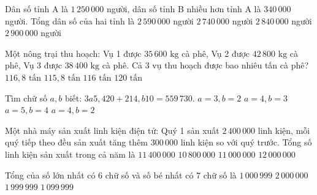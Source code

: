 \begin{ex} %
Dân số tỉnh A là $1\,250\,000$ người, dân số tỉnh B nhiều hơn tỉnh A là $340\,000$ người. Tổng dân số của hai tỉnh là
\choice
{$2\,590\,000$ người}
{$2\,740\,000$ người}
{\True $2\,840\,000$ người}
{$2\,900\,000$ người}
\end{ex}

\begin{ex} %
Một nông trại thu hoạch: Vụ 1 được $35\,600\text{ kg}$ cà phê, Vụ 2 được $42\,800\text{ kg}$ cà phê, Vụ 3 được $38\,400\text{ kg}$ cà phê. Cả 3 vụ thu hoạch được bao nhiêu tấn cà phê?
\choice
{\True $116{,}8\text{ tấn}$}
{$115{,}8\text{ tấn}$}
{$116\text{ tấn}$}
{$120\text{ tấn}$}
\end{ex}

\begin{ex} %
Tìm chữ số $a, b$ biết: $3a5,420 + 214,b10 = 559\,730$.
\choice
{$a = 3, b = 2$}
{\True $a = 4, b = 3$}
{$a = 5, b = 4$}
{$a = 4, b = 2$}
\end{ex}

\begin{ex} %
Một nhà máy sản xuất linh kiện điện tử: Quý 1 sản xuất $2\,400\,000$ linh kiện, mỗi quý tiếp theo đều sản xuất tăng thêm $300\,000$ linh kiện so với quý trước. Tổng số linh kiện sản xuất trong cả năm là
\choice
{\True $11\,400\,000$}
{$10\,800\,000$}
{$11\,000\,000$}
{$12\,000\,000$}
\end{ex}

\begin{ex} %
Tổng của số lớn nhất có 6 chữ số và số bé nhất có 7 chữ số là
\choice
{$1\,000\,999$}
{$2\,000\,000$}
{\True $1\,999\,999$}
{$1\,099\,999$}
\end{ex}

